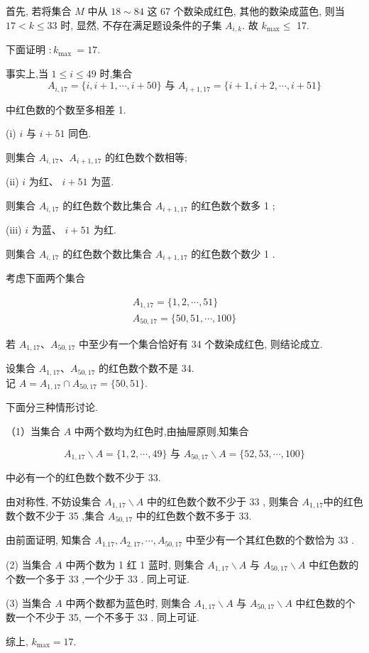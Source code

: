 \begin{solution}
	首先, 若将集合 $M$ 中从 $18 \sim 84$ 这 67 个数染成红色, 其他的数染成蓝色, 则当 $17<k \leqslant 33$ 时, 显然, 不存在满足题设条件的子集 $A_{i, k}$. 故 $k_{\max } \leqslant$ 17.

	下面证明 $: k_{\text {max }}=17$.

	事实上,当 $1 \leqslant i \leqslant 49$ 时,集合
	$$
		A_{i, 17}=\{i, i+1, \cdots, i+50\} \text { 与 } A_{i+1,17}=\{i+1, i+2, \cdots, i+51\}
	$$

	中红色数的个数至多相差 1.

	(i) $i$ 与 $i+51$ 同色.

	则集合 $A_{i, 17} 、 A_{i+1,17}$ 的红色数个数相等;

	(ii) $i$ 为红、 $i+51$ 为蓝.

	则集合 $A_{i, 17}$ 的红色数个数比集合 $A_{i+1,17}$ 的红色数个数多 1 ;

	(iii) $i$ 为蓝、 $i+51$ 为红.

	则集合 $A_{i, 17}$ 的红色数个数比集合 $A_{i+1,17}$ 的红色数个数少 1 .

	考虑下面两个集合

	$$
		\begin{gathered}
			A_{1,17}=\{1,2, \cdots, 51\} \\
			A_{50,17}=\{50,51, \cdots, 100\}
		\end{gathered}
	$$

	若 $A_{1,17} 、 A_{50,17}$ 中至少有一个集合恰好有 34 个数染成红色, 则结论成立.

	设集合 $A_{1,17} 、 A_{50,17}$ 的红色数个数不是 34.\\
	记 $A=A_{1,17} \cap A_{50,17}=\{50,51\}$.

	下面分三种情形讨论.

	（1）当集合 $A$ 中两个数均为红色时,由抽屉原则,知集合

	$$
		A_{1,17} \backslash A=\{1,2, \cdots, 49\} \text { 与 } A_{50,17} \backslash A=\{52,53, \cdots, 100\}
	$$

	中必有一个的红色数个数不少于 33.

	由对称性, 不妨设集合 $A_{1,17} \backslash A$ 中的红色数个数不少于 33 , 则集合 $A_{1,17}$中的红色数个数不少于 35 ,集合 $A_{50,17}$ 中的红色数个数不多于 33.

	由前面证明, 知集合 $A_{1.17}, A_{2,17}, \cdots, A_{50,17}$ 中至少有一个其红色数的个数恰为 33 .

	(2) 当集合 $A$ 中两个数为 1 红 1 蓝时, 则集合 $A_{1,17} \backslash A$ 与 $A_{50,17} \backslash A$ 中红色数的个数一个多于 33 ,一个少于 33 . 同上可证.

	(3) 当集合 $A$ 中两个数都为蓝色时, 则集合 $A_{1,17} \backslash A$ 与 $A_{50,17} \backslash A$ 中红色数的个数一个不少于 35, 一个不多于 33 . 同上可证.

	综上, $k_{\max }=17$.
\end{solution}

